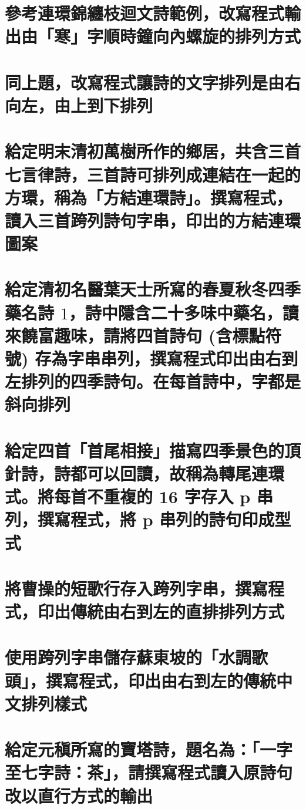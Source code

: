 \section{參考連環錦纏枝迴文詩範例，改寫程式輸出由「寒」字順時鐘向內螺旋的排列方式}


\section{同上題，改寫程式讓詩的文字排列是由右向左，由上到下排列}


\section{給定明末清初萬樹所作的鄉居，共含三首七言律詩，三首詩可排列成連結在一起的方環，稱為「方結連環詩」。撰寫程式，讀入三首跨列詩句字串，印出的方結連環圖案}


\section{給定清初名醫葉天士所寫的春夏秋冬四季藥名詩 $1$，詩中隱含二十多味中藥名，讀來饒富趣味，請將四首詩句 (含標點符號) 存為字串串列，撰寫程式印出由右到左排列的四季詩句。在每首詩中，字都是斜向排列}


\section{給定四首「首尾相接」描寫四季景色的頂針詩，詩都可以回讀，故稱為轉尾連環式。將每首不重複的 16 字存入 p 串列，撰寫程式，將 p 串列的詩句印成型式}


\section{將曹操的短歌行存入跨列字串，撰寫程式，印出傳統由右到左的直排排列方式}


\section{使用跨列字串儲存蘇東坡的「水調歌頭」，撰寫程式，印出由右到左的傳統中文排列樣式}


\section{給定元稹所寫的寶塔詩，題名為：「一字至七字詩：茶」，請撰寫程式讀入原詩句改以直行方式的輸出}


